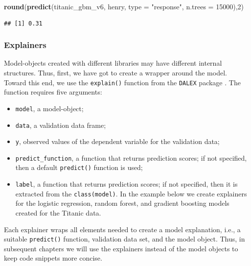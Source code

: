 \documentclass[12pt,]{krantz}
\newenvironment{Shaded}{\begin{snugshade}}{\end{snugshade}}
\newcommand{\DataTypeTok}[1]{\textcolor[rgb]{0.13,0.29,0.53}{#1}}
\newcommand{\DecValTok}[1]{\textcolor[rgb]{0.00,0.00,0.81}{#1}}
\newcommand{\KeywordTok}[1]{\textcolor[rgb]{0.13,0.29,0.53}{\textbf{#1}}}
\newcommand{\NormalTok}[1]{#1}
\newcommand{\StringTok}[1]{\textcolor[rgb]{0.31,0.60,0.02}{#1}}
\providecommand{\tightlist}{%
  \setlength{\itemsep}{0pt}\setlength{\parskip}{0pt}}
\begin{document}
\begin{Shaded}
\begin{Highlighting}[]
\KeywordTok{round}\NormalTok{(}\KeywordTok{predict}\NormalTok{(titanic_gbm_v6, henry, }\DataTypeTok{type =} \StringTok{"response"}\NormalTok{, }\DataTypeTok{n.trees =} \DecValTok{15000}\NormalTok{),}\DecValTok{2}\NormalTok{)}
\end{Highlighting}
\end{Shaded}

\begin{verbatim}
## [1] 0.31
\end{verbatim}

\hypertarget{ExplainersTitanicRCode}{%
\subsubsection{Explainers}\label{ExplainersTitanicRCode}}

Model-objects created with different libraries may have different internal structures. Thus, first, we have got to create a wrapper around the model. Toward this end, we use the \texttt{explain()} function from the \texttt{DALEX} package \citep{R-DALEX}. The function requires five arguments:

\begin{itemize}
\tightlist
\item
  \texttt{model}, a model-object;
\item
  \texttt{data}, a validation data frame;
\item
  \texttt{y}, observed values of the dependent variable for the validation data;
\item
  \texttt{predict\_function}, a function that returns prediction scores; if not specified, then a default \texttt{predict()} function is used;
\item
  \texttt{label}, a function that returns prediction scores; if not specified, then it is extracted from the \texttt{class(model)}.
  In the example below we create explainers for the logistic regression, random forest, and gradient boosting models created for the Titanic data.
\end{itemize}

Each explainer wraps all elements needed to create a model explanation, i.e., a suitable \texttt{predict()} function, validation data set, and the model object. Thus, in subsequent chapters we will use the explainers instead of the model objects to keep code snippets more concise.
\end{document}
